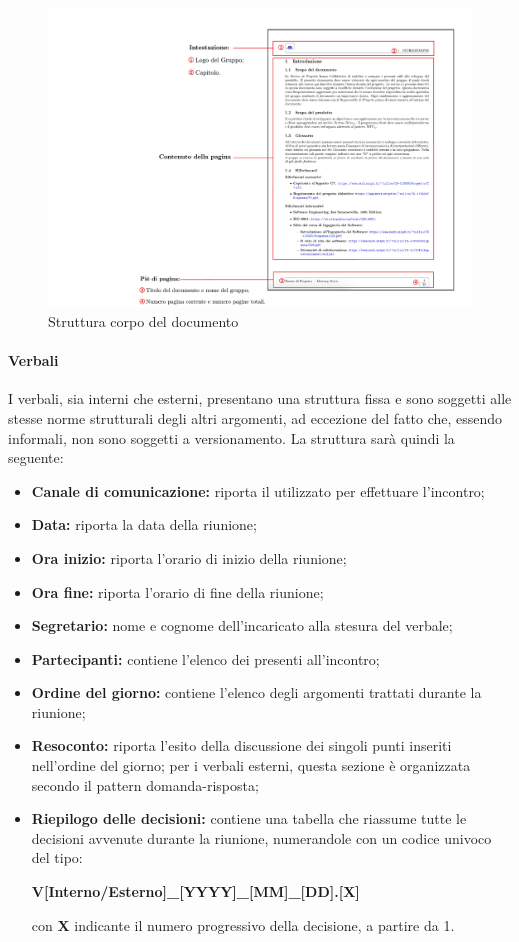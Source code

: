 {\begin{figure}[H]
    \centering
    \includegraphics[scale = 0.14]{components/immagini/corpodocumento.jpg}
    \caption{Struttura corpo del documento}
\end{figure}


\paragraph{Verbali}      
I verbali, sia interni che esterni, presentano una struttura fissa e sono soggetti alle stesse norme strutturali degli altri argomenti, ad eccezione del fatto che, essendo informali, non sono soggetti a versionamento.
La struttura sarà quindi la seguente:
\begin{itemize}
	\item \textbf{Canale di comunicazione:} riporta il  utilizzato per effettuare l'incontro;
	\item \textbf{Data:} riporta la data della riunione;
	\item \textbf{Ora inizio:} riporta l'orario di inizio della riunione;
	\item \textbf{Ora fine:} riporta l'orario di fine della riunione;
	\item \textbf{Segretario:} nome e cognome dell'incaricato alla stesura del verbale;
	\item \textbf{Partecipanti:} contiene l'elenco dei presenti all'incontro;   
	\item \textbf{Ordine del giorno:} contiene l'elenco degli argomenti trattati durante la riunione;
	\item \textbf{Resoconto:} riporta l'esito della discussione dei singoli punti inseriti nell'ordine del giorno; per i verbali esterni, questa sezione è organizzata secondo il pattern domanda-risposta;
	\item \textbf{Riepilogo delle decisioni:} contiene una tabella che riassume tutte le decisioni avvenute durante la riunione, numerandole con un codice univoco del tipo: \newline 
	\centerline{\textbf{V[Interno/Esterno]\_[YYYY]\_[MM]\_[DD].[X]}}\newline con \textbf{X} indicante il numero progressivo della decisione, a partire da 1.
\end{itemize}
}
